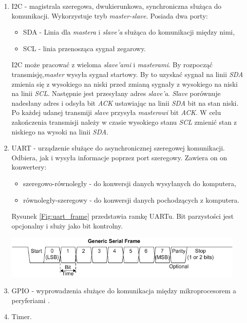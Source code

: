 \documentclass[11pt,a4paper]{article}
\begin{document}
\begin{enumerate}
			\item I2C - magistrala szeregowa, dwukierunkowa, synchroniczna służąca do komunikacji. Wykorzystuje tryb \textit{master-slave}. Posiada dwa porty:
			\begin{itemize}
				\item SDA - Linia dla \textit{mastera} i \textit{slave'a} służąca do komunikacji między nimi,
				\item SCL - linia przenosząca sygnał zegarowy.
			\end{itemize}
			I2C może pracować z wieloma \textit{slave'ami} i \textit{masterami}.  By rozpocząć transmisję,\textit{master} wysyła sygnał startowy. By to uzyskać sygnał na linii \textit{SDA} zmienia się z wysokiego na niski przed zmianą sygnały z wysokiego na niski na linii \textit{SCL}. Następnie jest przesyłany adres \textit{slave'a}. \textit{Slave} porównuje nadesłany adres i odsyła bit \textit{ACK} ustawiając na linii \textit{SDA} bit na stan niski. Po każdej udanej transmiji \textit{slave} przysyła \textit{masterowi} bit \textit{ACK}. W celu zakończenia transmisji należy w czasie wysokiego stanu \textit{SCL} zmienić stan z niskiego na wysoki na linii \textit{SDA}\cite{i2c_book}.


			\item UART - urządzenie służące do asynchronicznej szeregowej komunikacji. Odbiera, jak i wysyła informacje poprzez port szeregowy. Zawiera on on konwertery:
			\begin{itemize}
				\item szeregowo-równoległy - do konwersji danych wysyłanych do komputera,
				\item równoległy-szeregowy - do konwersji danych pochodzących z komputera.
			\end{itemize}	
			Rysunek \ref{Fig:uart_frame} przedstawia ramkę UARTu. Bit parzystości jest opcjonalny i służy jako bit kontrolny\cite{uart_book}.\\
\begin{minipage}{\textwidth}
				\begin{center}
					\includegraphics[width=12cm]{./rysunki/uart_frame.png}
				\end{center}
			\end{minipage}
			\item GPIO - wyprowadzenia służące do komunikacja między mikroprocesorem a peryferiami \cite{gpio_doc}.
			\item Timer.
			\end{enumerate}
\end{document}
